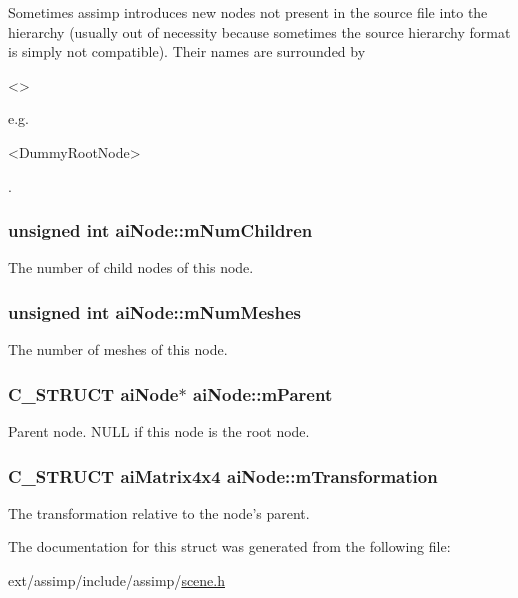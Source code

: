 Sometimes assimp introduces new nodes not present in the source file into the hierarchy (usually out of necessity because sometimes the source hierarchy format is simply not compatible). Their names are surrounded by\begin{DoxyVerb}<> \end{DoxyVerb}
 e.\-g. \begin{DoxyVerb}<DummyRootNode> \end{DoxyVerb}
. \hypertarget{structai_node_af5030494b156ec54632e6182a6e386ca}{
\subsubsection[{m\-Num\-Children}]{\setlength{\rightskip}{0pt plus 5cm}unsigned int ai\-Node\-::m\-Num\-Children}}\label{structai_node_af5030494b156ec54632e6182a6e386ca}
The number of child nodes of this node. \hypertarget{structai_node_a7a411079096f86d1e96b6368d237d897}{
\subsubsection[{m\-Num\-Meshes}]{\setlength{\rightskip}{0pt plus 5cm}unsigned int ai\-Node\-::m\-Num\-Meshes}}\label{structai_node_a7a411079096f86d1e96b6368d237d897}
The number of meshes of this node. \hypertarget{structai_node_aa6896b42c78e784db85d822a4c8dd404}{
\subsubsection[{m\-Parent}]{\setlength{\rightskip}{0pt plus 5cm}C\-\_\-\-S\-T\-R\-U\-C\-T {\bf ai\-Node}$\ast$ ai\-Node\-::m\-Parent}}\label{structai_node_aa6896b42c78e784db85d822a4c8dd404}
Parent node. N\-U\-L\-L if this node is the root node. \hypertarget{structai_node_aadb69c766c7658bba9d2195af16d6831}{
\subsubsection[{m\-Transformation}]{\setlength{\rightskip}{0pt plus 5cm}C\-\_\-\-S\-T\-R\-U\-C\-T {\bf ai\-Matrix4x4} ai\-Node\-::m\-Transformation}}\label{structai_node_aadb69c766c7658bba9d2195af16d6831}
The transformation relative to the node's parent. 

The documentation for this struct was generated from the following file\-:\begin{DoxyCompactItemize}
\item 
ext/assimp/include/assimp/\hyperlink{scene_8h}{scene.\-h}\end{DoxyCompactItemize}
